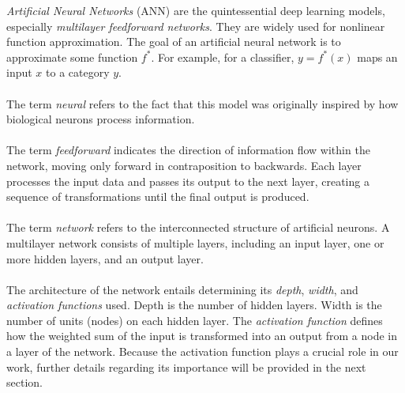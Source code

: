 \documentclass[../main.tex]{subfiles}
\begin{document}
	 
	 \noindent \textit{Artificial Neural Networks} (ANN) are the quintessential deep learning models, especially \textit{multilayer feedforward networks}. They are widely used for nonlinear function approximation. The goal of an artificial neural network is to approximate some function $f^*$. For example, for a classifier, $y = f^*(x)$ maps an input $x$ to a category $y$.  \\ \\ 
	 \noindent The term \textit{neural} refers  to the fact that this model was originally inspired by how biological neurons process information. \\ \\ 
	 \noindent The term \textit{feedforward} indicates the direction of information flow within the network, moving only forward in contraposition to backwards. Each layer processes the input data and passes its output to the next layer, creating a sequence of transformations until the final output is produced. \\ \\
	 \noindent The term \textit{network} refers to the interconnected structure of artificial neurons. A multilayer network consists of multiple layers, including an input layer, one or more hidden layers, and an output layer. \\ \\ %
	 \noindent The architecture of the network entails determining its \textit{depth}, \textit{width}, and \textit{activation functions} used. Depth is the number of hidden layers. Width is the number of units (nodes) on each hidden layer. The \textit{activation function} defines how the weighted sum of the input is transformed into an output from a node in a layer of the network. Because the activation function plays a crucial role in our work, further details regarding its importance will be provided in the next section.
	 
	 
\end{document}
